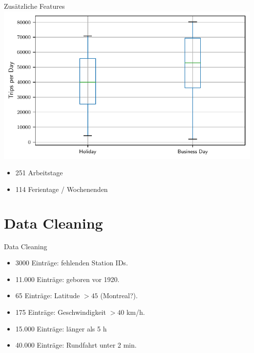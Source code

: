 \begin{frame}{Zusätzliche Features}
\centering
\includegraphics[height=0.6\textheight]{../Images/CountByBusiness}

{
\begin{itemize}
\item 251 Arbeitstage
\item 114 Ferientage / Wochenenden
\end{itemize}
}
\end{frame}

\section{Data Cleaning}

\begin{frame}{Data Cleaning}
\centering
{}
{
\begin{itemize}
\item 3000 Einträge: fehlenden Station IDs.
\item 11.000 Einträge: geboren vor 1920.
\item 65 Einträge: Latitude $ > 45$ (Montreal?).
\item 175 Einträge: Geschwindigkeit $ > 40$ km/h.
\item 15.000 Einträge: länger als 5 h
\item 40.000 Einträge: Rundfahrt unter 2 min.
\end{itemize}
}
\end{frame}

